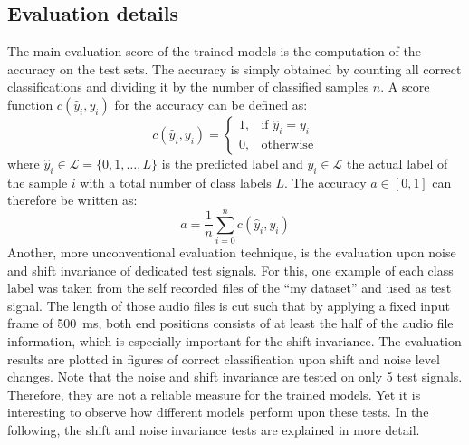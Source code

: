 \subsection{Evaluation details}\label{sec:exp_details_tb}
The main evaluation score of the trained models is the computation of the accuracy on the test sets.
The accuracy is simply obtained by counting all correct classifications and dividing it by the number of classified samples $n$.
A score function $c(\hat{y}_i, y_i)$ for the accuracy can be defined as:
\begin{equation}
  c(\hat{y}_i, y_i) = 
  \begin{cases}
    1, & \text{if } \hat{y}_i = y_i\\
    0, & \text{otherwise} 
  \end{cases}
\end{equation}
where $\hat{y}_i \in \mathcal{L} = \{0, 1, \dots, L\} $ is the predicted label and $y_i \in \mathcal{L}$ the actual label of the sample $i$ with a total number of class labels $L$.
The accuracy $a \in [0, 1]$ can therefore be written as:
\begin{equation}
  a = \frac{1}{n} \sum_{i=0}^n c(\hat{y}_i, y_i)
\end{equation}
Another, more unconventional evaluation technique, is the evaluation upon noise and shift invariance of dedicated test signals.
For this, one example of each class label was taken from the self recorded files of the \enquote{my dataset} and used as test signal.
The length of those audio files is cut such that by applying a fixed input frame of \SI{500}{\milli\second}, both end positions consists of at least the half of the audio file information, which is especially important for the shift invariance.
The evaluation results are plotted in figures of correct classification upon shift and noise level changes.
Note that the noise and shift invariance are tested on only 5 test signals.
Therefore, they are not a reliable measure for the trained models.
Yet it is interesting to observe how different models perform upon these tests.
In the following, the shift and noise invariance tests are explained in more detail.



